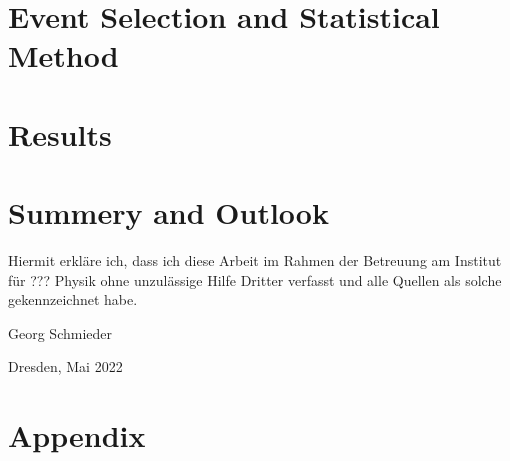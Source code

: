 \chapter{Event Selection and Statistical Method}


\chapter{Results}


\chapter{Summery and Outlook}



\newpage

\listoffigures
\listoftables

\clearpage
\thispagestyle{empty}
\vspace*{1.5em}

Hiermit erkläre ich, dass ich diese Arbeit im Rahmen der Betreuung am Institut
für ??? Physik ohne unzulässige Hilfe Dritter verfasst und alle Quellen als solche gekennzeichnet habe.

\vspace*{45em}

Georg Schmieder \par
Dresden, Mai 2022

\chapter{Appendix}
\label{sec:appendix}
